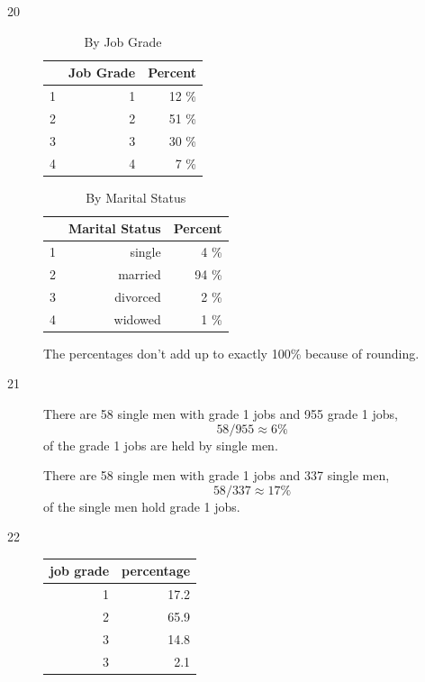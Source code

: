 \documentclass[letterpaper, landscape]{exam}
\begin{document}
\begin{description}
      \item[20]
        \begin{table}[H]
          \centering
          \begin{tabular}{rrr}
            \toprule
              & Job Grade & Percent \\
            \midrule
            1 & 1         & 12 \% \\
            2 & 2         & 51 \% \\
            3 & 3         & 30 \% \\
            4 & 4         & 7 \% \\
            \bottomrule
          \end{tabular}
          \caption{By Job Grade}
        \end{table}

        \begin{table}[H]
          \centering
          \begin{tabular}{rrr}
            \toprule
              & Marital Status & Percent \\
            \midrule
            1 & single         & 4 \% \\
            2 & married        & 94 \% \\
            3 & divorced       & 2 \% \\
            4 & widowed        & 1 \% \\
            \bottomrule
          \end{tabular}
          \caption{By Marital Status}
        \end{table}

      The percentages don't add up to exactly 100\% because of rounding.
      
    \item[21]
      There are 58 single men with grade 1 jobs and 955 grade 1 jobs, 
      \[
        58/955 \approx 6 \%
      \]
      of the grade 1 jobs are held by single men.

      There are 58 single men with grade 1 jobs and 337 single men, 
      \[
        58/337 \approx 17 \% 
      \]
      of the single men hold grade 1 jobs.

    \item[22]
      \begin{table}[H]
        \centering
        \begin{tabular}{rr}
          \toprule
          job grade & percentage \\
          \midrule
          1         & 17.2  \\
          2         & 65.9  \\
          3         & 14.8  \\
          3         & 2.1   \\
          \bottomrule
        \end{tabular}
      \end{table}


\end{description}
\end{document}
